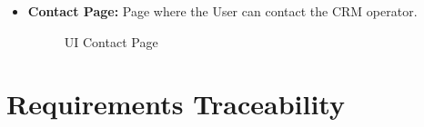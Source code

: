 \documentclass[a4paper]{article}
\begin{document}
\begin {itemize}
\begin{figure}[h!]
\centering
\vspace*{\fill}
\noindent{}%
\caption {UI Email Page}
\vspace*{0.2cm}
\end{figure}
\pagebreak
\item \textbf{Contact Page:} Page where the User can contact the CRM operator.
\begin{figure}[h!]
\centering
\vspace*{\fill}
\noindent{}%
\caption {UI Contact Page}
\vspace*{0.2cm}
\end{figure}
\end{itemize}

\section{Requirements Traceability}
\end{document}
